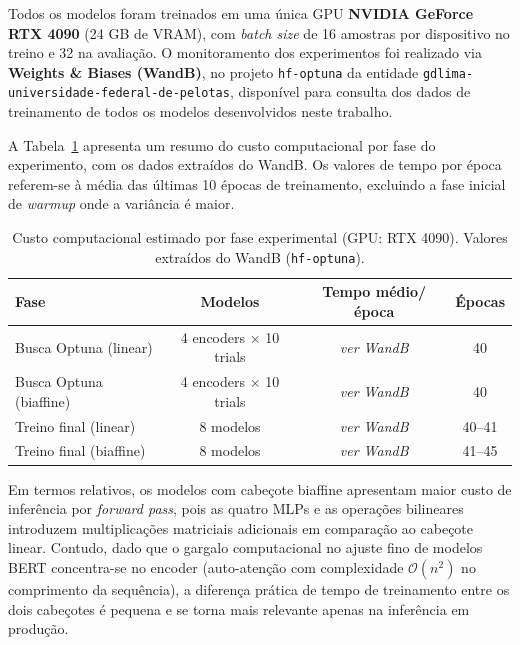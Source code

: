 Todos os modelos foram treinados em uma única GPU \textbf{NVIDIA GeForce RTX 4090} (24 GB
de VRAM), com \textit{batch size} de 16 amostras por dispositivo no treino e 32 na avaliação.
O monitoramento dos experimentos foi realizado via \textbf{Weights \& Biases (WandB)}, no
projeto \texttt{hf-optuna} da entidade \texttt{gdlima-universidade-federal-de-pelotas},
disponível para consulta dos dados de treinamento de todos os modelos desenvolvidos neste
trabalho.

A Tabela~\ref{tab:custo_computacional} apresenta um resumo do custo computacional por fase
do experimento, com os dados extraídos do WandB. Os valores de tempo por época referem-se
à média das últimas 10 épocas de treinamento, excluindo a fase inicial de \textit{warmup}
onde a variância é maior.


\begin{table}[ht]
\centering
\caption{Custo computacional estimado por fase experimental (GPU: RTX 4090).
         Valores extraídos do WandB (\texttt{hf-optuna}).}
\label{tab:custo_computacional}
\setlength{\tabcolsep}{8pt}
\begin{tabular}{l c c c}
\toprule
\textbf{Fase} & \textbf{Modelos} & \textbf{Tempo médio/época} & \textbf{Épocas} \\
\midrule
Busca Optuna (linear)   & 4 encoders × 10 trials & \textit{ver WandB} & 40 \\
Busca Optuna (biaffine) & 4 encoders × 10 trials & \textit{ver WandB} & 40 \\
Treino final (linear)   & 8 modelos              & \textit{ver WandB} & 40--41 \\
Treino final (biaffine) & 8 modelos              & \textit{ver WandB} & 41--45 \\
\bottomrule
\end{tabular}
\end{table}

Em termos relativos, os modelos com cabeçote biaffine apresentam maior custo de inferência
por \textit{forward pass}, pois as quatro MLPs e as operações bilineares introduzem
multiplicações matriciais adicionais em comparação ao cabeçote linear. Contudo, dado que o
gargalo computacional no ajuste fino de modelos BERT concentra-se no encoder
(auto-atenção com complexidade $\mathcal{O}(n^2)$ no comprimento da sequência), a diferença
prática de tempo de treinamento entre os dois cabeçotes é pequena e se torna mais relevante
apenas na inferência em produção.

